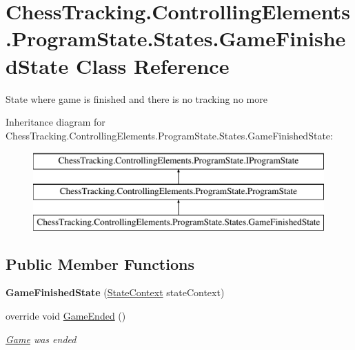 \hypertarget{class_chess_tracking_1_1_controlling_elements_1_1_program_state_1_1_states_1_1_game_finished_state}{}\section{Chess\+Tracking.\+Controlling\+Elements.\+Program\+State.\+States.\+Game\+Finished\+State Class Reference}
\label{class_chess_tracking_1_1_controlling_elements_1_1_program_state_1_1_states_1_1_game_finished_state}


State where game is finished and there is no tracking no more  


Inheritance diagram for Chess\+Tracking.\+Controlling\+Elements.\+Program\+State.\+States.\+Game\+Finished\+State\+:\begin{figure}[H]
\begin{center}
\leavevmode
\includegraphics[height=3.000000cm]{class_chess_tracking_1_1_controlling_elements_1_1_program_state_1_1_states_1_1_game_finished_state}
\end{center}
\end{figure}
\subsection*{Public Member Functions}
\begin{DoxyCompactItemize}
\item 
\mbox{\label{class_chess_tracking_1_1_controlling_elements_1_1_program_state_1_1_states_1_1_game_finished_state_a0b4052e7708884d3b1968103a384a632}} 
{\bfseries Game\+Finished\+State} (\mbox{\hyperlink{class_chess_tracking_1_1_controlling_elements_1_1_program_state_1_1_state_context}{State\+Context}} state\+Context)
\item 
override void \mbox{\hyperlink{class_chess_tracking_1_1_controlling_elements_1_1_program_state_1_1_states_1_1_game_finished_state_a13eabd72515fdbb1fc9b0026ff7800a7}{Game\+Ended}} ()
\begin{DoxyCompactList}\small\item\em \mbox{\hyperlink{namespace_chess_tracking_1_1_game}{Game}} was ended \end{DoxyCompactList}\end{DoxyCompactItemize}
